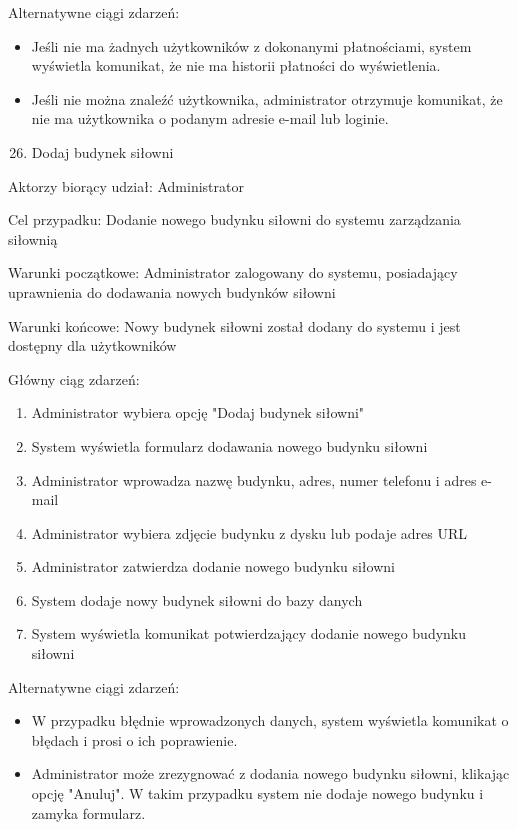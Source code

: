 \documentclass[
]{article}
\providecommand{\tightlist}{%
  \setlength{\itemsep}{0pt}\setlength{\parskip}{0pt}}
\begin{document}
{Alternatywne ciągi zdarzeń:}

\begin{itemize}
\tightlist
\item
  {Jeśli nie ma żadnych użytkowników z dokonanymi płatnościami, system
  wyświetla komunikat, że nie ma historii płatności do wyświetlenia.}
\item
  {Jeśli nie można znaleźć użytkownika, administrator otrzymuje
  komunikat, że nie ma użytkownika o podanym adresie e-mail lub
  loginie.}
\end{itemize}

{}

{}

\begin{enumerate}
\setcounter{enumi}{25}
\tightlist
\item
  {Dodaj budynek siłowni}
\end{enumerate}

{Aktorzy biorący udział: Administrator}

{Cel przypadku: Dodanie nowego budynku siłowni do systemu zarządzania
siłownią}

{Warunki początkowe: Administrator zalogowany do systemu, posiadający
uprawnienia do dodawania nowych budynków siłowni}

{Warunki końcowe: Nowy budynek siłowni został dodany do systemu i jest
dostępny dla użytkowników}

{Główny ciąg zdarzeń:}

\begin{enumerate}
\tightlist
\item
  {Administrator wybiera opcję "Dodaj budynek siłowni"}
\item
  {System wyświetla formularz dodawania nowego budynku siłowni}
\item
  {Administrator wprowadza nazwę budynku, adres, numer telefonu i adres
  e-mail}
\item
  {Administrator wybiera zdjęcie budynku z dysku lub podaje adres URL}
\item
  {Administrator zatwierdza dodanie nowego budynku siłowni}
\item
  {System dodaje nowy budynek siłowni do bazy danych}
\item
  {System wyświetla komunikat potwierdzający dodanie nowego budynku
  siłowni}
\end{enumerate}

{Alternatywne ciągi zdarzeń:}

\begin{itemize}
\tightlist
\item
  {W przypadku błędnie wprowadzonych danych, system wyświetla komunikat
  o błędach i prosi o ich poprawienie.}
\item
  {Administrator może zrezygnować z dodania nowego budynku siłowni,
  klikając opcję "Anuluj". W takim przypadku system nie dodaje nowego
  budynku i zamyka formularz.}
\end{itemize}
\end{document}

